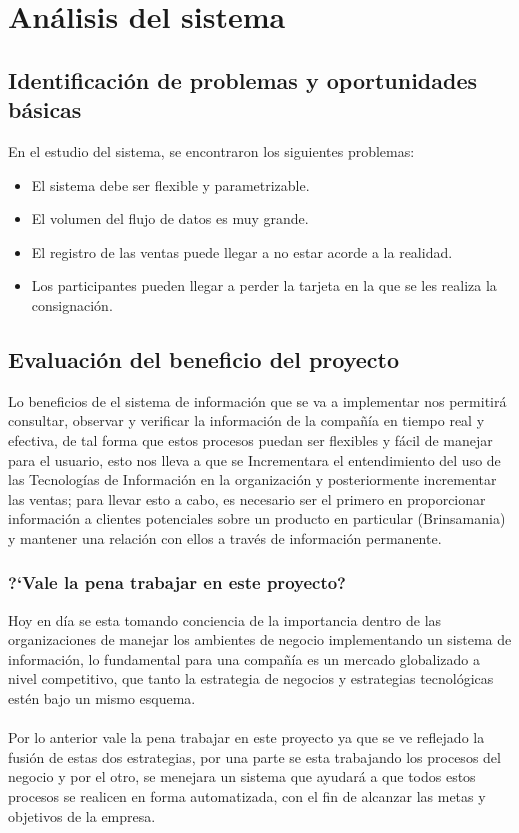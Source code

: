\chapter{An\'alisis del sistema}
\section{Identificaci\'on de problemas y oportunidades b\'asicas}
En el estudio del sistema, se encontraron los siguientes problemas:%
\\
\begin{itemize}
\item El sistema debe ser flexible y parametrizable.%
\item El volumen del flujo de datos es muy grande.%
\item El registro de las ventas puede llegar a no estar acorde a la realidad.%
\item Los participantes pueden llegar a perder la tarjeta en la que se les realiza la consignaci\'on.%
\end{itemize}%
%
%
\section{Evaluaci\'on del beneficio del proyecto}
Lo beneficios de el sistema de informaci\'on que se va a implementar nos permitir\'a consultar, observar y verificar la informaci\'on de la compa\~n\'ia en tiempo real y efectiva, de tal forma que estos procesos puedan ser flexibles y f\'acil de manejar para el usuario, esto nos lleva a que se Incrementara  el entendimiento del uso de las Tecnolog\'ias de Informaci\'on en la organizaci\'on y posteriormente  incrementar las ventas; para llevar esto a cabo, es necesario ser el primero en proporcionar informaci\'on a clientes potenciales sobre un producto en particular (Brinsamania) y mantener una relaci\'on con ellos a trav\'es de informaci\'on permanente.%
%
\subsection{?`Vale la pena trabajar en este proyecto?}
Hoy en d\'ia se esta tomando conciencia de la importancia dentro de las organizaciones de manejar los ambientes de negocio implementando un sistema de informaci\'on, lo fundamental para una compa\~n\'ia es un mercado globalizado a nivel competitivo, que tanto la estrategia de negocios y estrategias tecnol\'ogicas est\'en bajo un mismo esquema.%
\\%
\\%
Por lo anterior vale la pena trabajar en este proyecto ya que se ve reflejado la fusi\'on de estas dos estrategias, por una parte se esta trabajando los procesos del negocio y por el otro, se menejara un sistema que ayudar\'a a que todos estos procesos se realicen en forma automatizada, con el fin de alcanzar las metas y objetivos de la empresa.%
%
